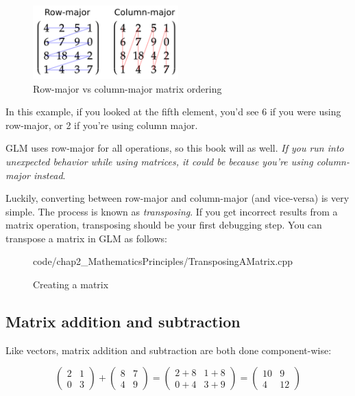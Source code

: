 \begin{figure}[ht]
    \centering
    \includegraphics[width=0.5\textwidth]{images/chap2/RowVsColumn.png}
    \caption{Row-major vs column-major matrix ordering}
    \label{fig:row_vs_column}
\end{figure}

In this example, if you looked at the fifth element, you'd see 6 if you were using row-major, or 2 if you're using column major.

GLM uses row-major for all operations, so this book will as well. \emph{If you run into unexpected behavior while using matrices, it could be because you're using column-major instead}.

Luckily, converting between row-major and column-major (and vice-versa) is very simple. The process is known as \emph{transposing}. If you get incorrect results from a matrix operation, transposing should be your first debugging step. You can transpose a matrix in GLM as follows:

\begin{figure}[ht]
    \centering
    \colorbox{backgroundcolor}{
        \parbox{0.9\textwidth}{
            
            {code/chap2_MathematicsPrinciples/TransposingAMatrix.cpp}
        }
    }
    \caption{Creating a matrix}
    \label{fig:creating_a_matrixtwo}
\end{figure}

\subsection{\textsf{Matrix addition and subtraction}}
Like vectors, matrix addition and subtraction are both done component-wise:

\begin{equation*}
    \begin{pmatrix}
    2 & 1\\
    0 & 3
    \end{pmatrix} +\begin{pmatrix}
    8 & 7\\
    4 & 9
    \end{pmatrix} =\begin{pmatrix}
    2+8 & 1+8\\
    0+4 & 3+9
    \end{pmatrix} =\begin{pmatrix}
    10 & 9\\
    4 & 12
    \end{pmatrix}
\end{equation*}

